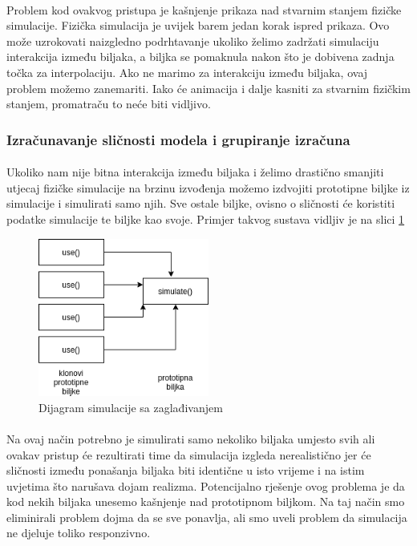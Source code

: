 \documentclass[times, utf8, diplomski]{fer}
\begin{document}
\paragraph{}
Problem kod ovakvog pristupa je kašnjenje prikaza nad stvarnim stanjem fizičke 
simulacije. Fizička simulacija je uvijek barem jedan korak ispred prikaza. Ovo 
može uzrokovati naizgledno podrhtavanje ukoliko želimo zadržati simulaciju 
interakcija između biljaka, a biljka se pomaknula nakon što je dobivena zadnja 
točka za interpolaciju. Ako ne marimo za interakciju između biljaka, ovaj 
problem možemo zanemariti. Iako će animacija i dalje kasniti za stvarnim 
fizičkim stanjem, promatraču to neće biti vidljivo.
\subsubsection{Izračunavanje sličnosti modela i grupiranje izračuna}
\paragraph{}
Ukoliko nam nije bitna interakcija između biljaka i želimo drastično smanjiti utjecaj fizičke simulacije na brzinu izvođenja možemo izdvojiti prototipne biljke iz simulacije i simulirati samo njih. Sve ostale biljke, ovisno o sličnosti će koristiti podatke simulacije te biljke kao svoje. Primjer takvog sustava vidljiv je na slici \ref{fig:531-3}
\begin{figure}[h]
	\centering
	\includegraphics[width=0.5\textwidth]{img/531-3}
	\caption{Dijagram simulacije sa zaglađivanjem}
	\label{fig:531-3}
\end{figure}
\paragraph{}
Na ovaj način potrebno je simulirati samo nekoliko biljaka umjesto svih ali ovakav pristup će rezultirati time da simulacija izgleda nerealistično jer će sličnosti između ponašanja biljaka biti identične u isto vrijeme i na istim uvjetima što narušava dojam realizma. Potencijalno rješenje ovog problema je da kod nekih biljaka unesemo kašnjenje nad prototipnom biljkom. Na taj način smo eliminirali problem dojma da se sve ponavlja, ali smo uveli problem da simulacija ne djeluje toliko responzivno.
\end{document}
